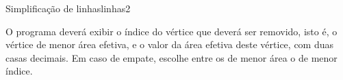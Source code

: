 \documentclass[12pt,a4paper,oneside]{article}
\begin{document}
\begin{problem}{Simplificação de linhas}{linhas}{2}
\OutputFile

O programa deverá exibir o índice do vértice que deverá ser removido, isto é, o vértice de menor área efetiva, e o valor da área efetiva deste vértice, com duas casas decimais. Em caso de empate, escolhe entre os de menor área o de menor índice.\\[-18pt]


\Example

\begin{example}
%
\end{example}

\begin{example}
%
\end{example}


\begin{example}
%
\end{example}



\end{problem}
\end{document}
